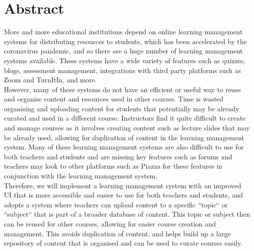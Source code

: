\chapter*{Abstract}\label{abstract}
More and more educational institutions depend on online learning management systems for distributing resources to students, which has been accelerated by the coronavirus pandemic, and so there are a huge number of learning management systems available. These systems have a wide variety of features such as quizzes, blogs, assessment management, integrations with third party platforms such as Zoom and TurnItIn, and more. \\

However, many of these systems do not have an efficient or useful way to reuse and organise content and resources used in other courses. Time is wasted organising and uploading content for students that potentially may be already curated and used in a different course. Instructors find it quite difficult to create and manage courses as it involves creating content such as lecture slides that may be already used, allowing for duplication of content in the learning management system. Many of these learning management systems are also difficult to use for both teachers and students and are missing key features such as forums and teachers may look to other platforms such as Piazza for these features in conjunction with the learning management system. \\

Therefore, we will implement a learning management system with an improved UI that is more accessible and easier to use for both teachers and students, and adopts a system where teachers can upload content to a specific ``topic`` or ``subject`` that is part of a broader database of content. This topic or subject then can be reused for other courses, allowing for easier course creation and management. This avoids duplication of content, and helps build up a large repository of content that is organised and can be used to curate courses easily.